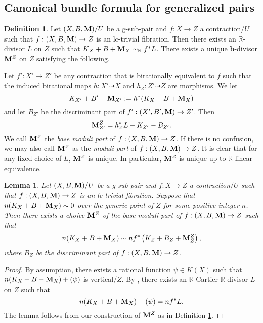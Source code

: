 \documentclass[11pt]{amsart}
\numberwithin{equation}{section}
\newcommand{\bb}{\bm{b}}
\newcommand{\Mm}{{\bf{M}}}
\newcommand{\Rr}{\mathbb{R}}
\newtheorem{lem}[thm]{Lemma}
\theoremstyle{definition}
\newtheorem{defn}[thm]{Definition}
\theoremstyle{definition}
\theoremstyle{definition}
\begin{document}
\subsection{Canonical bundle formula for generalized pairs}\label{subsec: cbf gpair}

\begin{defn}\label{defn: cbf gpair}
Let $(X,B,\Mm)/U$ be a g-sub-pair and $f: X\rightarrow Z$ a contraction$/U$ such that $f: (X,B,\Mm)\rightarrow Z$ is an lc-trivial fibration. Then there exists an $\Rr$-divisor $L$ on $Z$ such that $K_X+B+\Mm_X\sim_{\mathbb R}f^*L$. There exists a unique $\bb$-divisor $\Mm^Z$ on $Z$ satisfying the following.
    
Let $f': X'\rightarrow Z'$ be any contraction that is birationally equivalent to $f$ such that the induced birational maps $h: X'\dashrightarrow X$ and $h_Z: Z'\dashrightarrow Z$ are morphisms. We let $$K_{X'}+B'+\Mm_{X'}:=h^*(K_X+B+\Mm_X)$$
and let $B_{Z'}$ be the  discriminant part of $f': (X',B',\Mm)\rightarrow Z'$. Then
$$\Mm^Z_{Z'}=h_Z^*L-K_{Z'}-B_{Z'}.$$
We call $\Mm^Z$ the \emph{base moduli part} of $f: (X,B,\Mm)\rightarrow Z$. If there is no confusion, we may also call $\Mm^Z$ as the \emph{moduli part} of $f: (X,B,\Mm)\rightarrow Z$. It is clear that for any fixed choice of $L$, $\Mm^Z$ is unique. In particular, $\Mm^Z$ is unique up to $\Rr$-linear equivalence.
\end{defn}

\begin{lem}\label{lem: order along generic fiber cbf}
Let $(X,B,\Mm)/U$ be a g-sub-pair and $f: X\rightarrow Z$ a contraction$/U$ such that $f: (X,B,\Mm)\rightarrow Z$ is an lc-trivial fibration. Suppose that $n(K_X+B+\Mm_X)\sim 0$ over the generic point of $Z$ for some positive integer $n$. Then there exists a choice $\Mm^Z$ of the base moduli part of $f: (X,B,\Mm)\rightarrow Z$ such that 
$$n(K_X+B+\Mm_X)\sim nf^*\left(K_Z+B_Z+\Mm^Z_Z\right),$$
where $B_Z$ be the discriminant part of $f: (X,B,\Mm)\rightarrow Z$.
\end{lem}
\begin{proof}
By assumption, there exists a rational function $\psi\in K(X)$ such that $n(K_X+B+\Mm_X)+(\psi)$ is vertical$/Z$. By \cite[Lemma 2.5]{CHL23}, there exists an $\Rr$-Cartier $\Rr$-divisor $L$ on $Z$ such that
$$n(K_X+B+\Mm_X)+(\psi)=nf^*L.$$
The lemma follows from our construction of $\Mm^Z$ as in Definition \ref{defn: cbf gpair}.
\end{proof}
\end{document}
